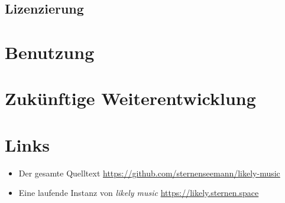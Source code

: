 \documentclass[a4paper,twocolumn]{article}
\begin{document}
\subsection*{Lizenzierung}

\section*{Benutzung}

\section*{Zukünftige Weiterentwicklung}

\section*{Links}

\begin{itemize}
\item Der gesamte Quelltext \url{https://github.com/sternenseemann/likely-music}
\item Eine laufende Instanz von {\it likely music} \url{https://likely.sternen.space}
\end{itemize}
\end{document}
